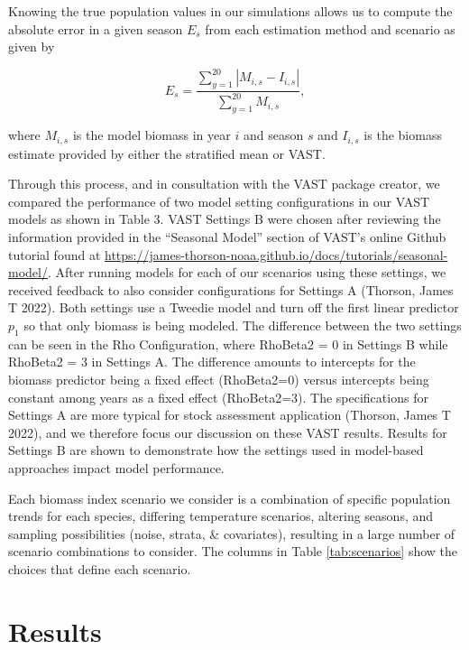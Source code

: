 \documentclass[
  12pt,
]{article}
\begin{document}
Knowing the true population values in our simulations allows us to compute the absolute error in a given season \(E_s\) from each estimation method and scenario as given by

\begin{equation}
E_s = \frac{\sum_{y=1}^{20}|M_{i,s}-I_{i,s}|}{\sum_{y=1}^{20}M_{i,s}},
\end{equation}

where \(M_{i,s}\) is the model biomass in year \(i\) and season \(s\) and \(I_{i,s}\) is the biomass estimate provided by either the stratified mean or VAST.

Through this process, and in consultation with the VAST package creator, we compared the performance of two model setting configurations in our VAST models as shown in Table 3. VAST Settings B were chosen after reviewing the information provided in the ``Seasonal Model'' section of VAST's online Github tutorial found at \url{https://james-thorson-noaa.github.io/docs/tutorials/seasonal-model/}. After running models for each of our scenarios using these settings, we received feedback to also consider configurations for Settings A (Thorson, James T 2022). Both settings use a Tweedie model and turn off the first linear predictor \(p_1\) so that only biomass is being modeled. The difference between the two settings can be seen in the Rho Configuration, where RhoBeta2 = 0 in Settings B while RhoBeta2 = 3 in Settings A. The difference amounts to intercepts for the biomass predictor being a fixed effect (RhoBeta2=0) versus intercepts being constant among years as a fixed effect (RhoBeta2=3). The specifications for Settings A are more typical for stock assessment application (Thorson, James T 2022), and we therefore focus our discussion on these VAST results. Results for Settings B are shown to demonstrate how the settings used in model-based approaches impact model performance.

Each biomass index scenario we consider is a combination of specific population trends for each species, differing temperature scenarios, altering seasons, and sampling possibilities (noise, strata, \& covariates), resulting in a large number of scenario combinations to consider. The columns in Table \ref{tab:scenarios} show the choices that define each scenario.

\section{Results}
\end{document}
